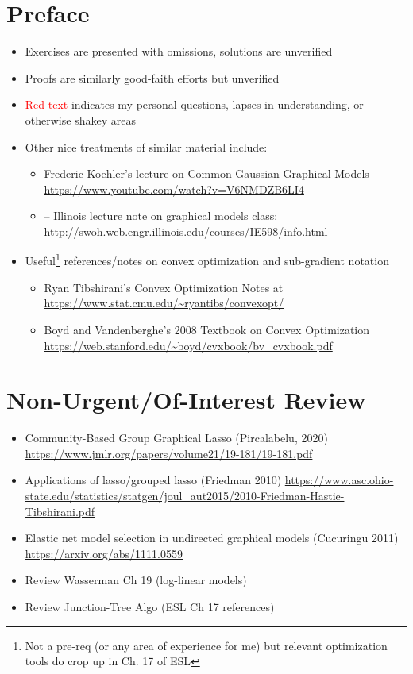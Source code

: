 \documentclass[11pt]{article}
\begin{document}
\section*{Preface}

\begin{itemize}
    \item Exercises are presented with omissions, solutions are unverified 
    \item Proofs are similarly good-faith efforts but unverified 
    \item \textcolor{red}{Red text} indicates my personal questions, lapses in understanding, or otherwise shakey areas 
    \item Other nice treatments of similar material include:
    \begin{itemize}
            \item Frederic Koehler's lecture on Common Gaussian Graphical Models \url{https://www.youtube.com/watch?v=V6NMDZB6LI4}
        	\item -- Illinois lecture note on graphical models class: \url{http://swoh.web.engr.illinois.edu/courses/IE598/info.html}
    \end{itemize}
    \item Useful\footnote{Not a pre-req (or any area of experience for me) but relevant optimization tools do crop up in Ch. 17 of ESL} references/notes on convex optimization and sub-gradient notation 
    \begin{itemize}
            \item Ryan Tibshirani's Convex Optimization Notes at \url{https://www.stat.cmu.edu/~ryantibs/convexopt/}
            \item Boyd and Vandenberghe's 2008 Textbook on Convex Optimization \url{https://web.stanford.edu/~boyd/cvxbook/bv_cvxbook.pdf}
    \end{itemize}
\end{itemize}

\section*{Non-Urgent/Of-Interest Review}

\begin{itemize}
    \item Community-Based Group Graphical Lasso (Pircalabelu, 2020) \url{https://www.jmlr.org/papers/volume21/19-181/19-181.pdf}
    \item Applications of lasso/grouped lasso (Friedman 2010) \url{https://www.asc.ohio-state.edu/statistics/statgen/joul_aut2015/2010-Friedman-Hastie-Tibshirani.pdf}
    \item Elastic net model selection in undirected graphical models (Cucuringu 2011) \url{https://arxiv.org/abs/1111.0559}
    \item Review Wasserman Ch 19 (log-linear models)
    \item Review Junction-Tree Algo (ESL Ch 17 references) 
\end{itemize}
\end{document}
